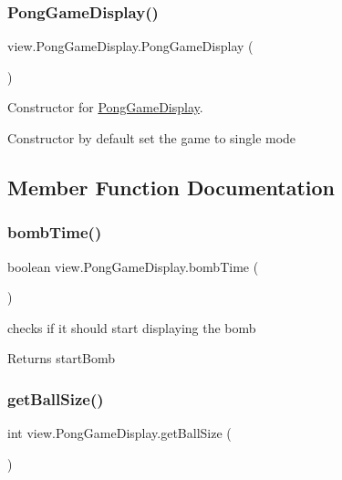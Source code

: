 \subsubsection{\texorpdfstring{Pong\+Game\+Display()}{PongGameDisplay()}}
{\footnotesize\ttfamily view.\+Pong\+Game\+Display.\+Pong\+Game\+Display (\begin{DoxyParamCaption}{ }\end{DoxyParamCaption})}



Constructor for \hyperlink{classview_1_1_pong_game_display}{Pong\+Game\+Display}. 

Constructor by default set the game to single mode 

\subsection{Member Function Documentation}
\hypertarget{classview_1_1_pong_game_display_a655e0b247af65aa672e233c321488750}{}\label{classview_1_1_pong_game_display_a655e0b247af65aa672e233c321488750} 
\subsubsection{\texorpdfstring{bomb\+Time()}{bombTime()}}
{\footnotesize\ttfamily boolean view.\+Pong\+Game\+Display.\+bomb\+Time (\begin{DoxyParamCaption}{ }\end{DoxyParamCaption})}



checks if it should start displaying the bomb 

\begin{DoxyReturn}{Returns}
start\+Bomb 
\end{DoxyReturn}
\hypertarget{classview_1_1_pong_game_display_a877f192e2651263a9f6ffec587dd8e80}{}\label{classview_1_1_pong_game_display_a877f192e2651263a9f6ffec587dd8e80} 
\subsubsection{\texorpdfstring{get\+Ball\+Size()}{getBallSize()}}
{\footnotesize\ttfamily int view.\+Pong\+Game\+Display.\+get\+Ball\+Size (\begin{DoxyParamCaption}{ }\end{DoxyParamCaption})}



